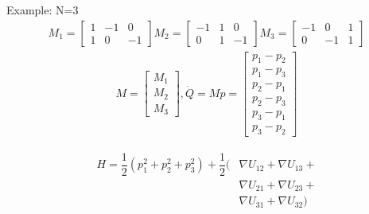 \begin{frame}{Example: N=3}
    \begin{gather*}
        M_1 = 
        \begin{bmatrix}
            1 & -1 & 0 \\
            1 & 0 & -1 
        \end{bmatrix}
        M_2 = 
        \begin{bmatrix}
            -1 & 1 & 0 \\
            0 & 1 & -1 
        \end{bmatrix}
        M_3 = 
        \begin{bmatrix}
            -1 & 0 & 1 \\
            0 & -1 & 1 
        \end{bmatrix}
    \end{gather*}
    \begin{gather*}
        M = 
        \begin{bmatrix}
            M_1 \\ 
            M_2 \\
            M_3
        \end{bmatrix},
        \dot Q = Mp = 
        \begin{bmatrix}
            p_1 - p_2 \\
            p_1 - p_3 \\
            p_2 - p_1 \\
            p_2 - p_3 \\
            p_3 - p_1 \\
            p_3 - p_2 
        \end{bmatrix}
    \end{gather*}

    \begin{align*}
        H = \dfrac{1}{2}(p_1^2 + p_2^2 + p_3^2) + \dfrac{1}{2}(&\nabla U_{12} + \nabla  U_{13} + \\  
        &\nabla  U_{21} +\nabla  U_{23} + \\ 
        &\nabla  U_{31} +\nabla  U_{32})
    \end{align*}
\end{frame}
